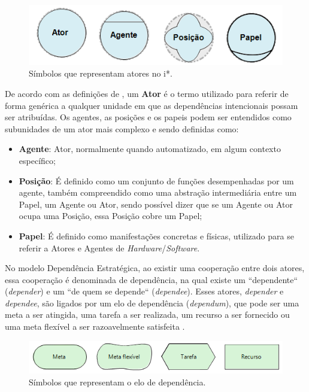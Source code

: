 \begin{figure}[h!]
	\centering
	\includegraphics[keepaspectratio=true,scale=1.0]{figuras/papeisIstar.PNG}
	\caption{Símbolos que representam atores no i*.}
	\label{atoresIstar}
\end{figure}

De acordo com as definições de \cite{istarwiki20}, um  \textbf{Ator} é o termo utilizado para referir de forma genérica a qualquer unidade em que as dependências intencionais possam ser atribuídas. Os agentes, as posições e os papeis podem ser entendidos como subunidades de um ator mais complexo e sendo definidas como: 

\begin{itemize}
	\item \textbf{Agente}: Ator, normalmente quando automatizado, em algum contexto específico;
	 
	\item \textbf{Posição}: É definido como um conjunto de funções desempenhadas por um agente, também compreendido como uma abstração intermediária entre um Papel, um Agente ou Ator, sendo possível dizer que se um Agente ou Ator ocupa uma Posição, essa Posição cobre um Papel;
	
	\item \textbf{Papel}: É definido como manifestações concretas e físicas, utilizado para se referir a Atores e Agentes de \textit{Hardware}/\textit{Software}.
\end{itemize} 

No modelo Dependência Estratégica, ao existir uma cooperação entre dois atores, essa cooperação é denominada de dependência, na qual existe um ``dependente`` (\textit{depender}) e um ``de quem se depende`` (\textit{dependee}). Esses atores, \textit{depender} e \textit{dependee}, são ligados por um elo de dependência (\textit{dependum}), que pode ser uma meta a ser atingida, uma tarefa a ser realizada, um recurso a ser fornecido ou uma meta flexível a ser razoavelmente satisfeita \cite{napolitano2009estrategia}. 

\begin{figure}[h!]
	\centering
	\includegraphics[keepaspectratio=true,scale=1.0]{figuras/TiposDeContribuicao.png}
	\caption{Símbolos que representam o elo de dependência.}
	\label{dependenciaIstar}
\end{figure} 

